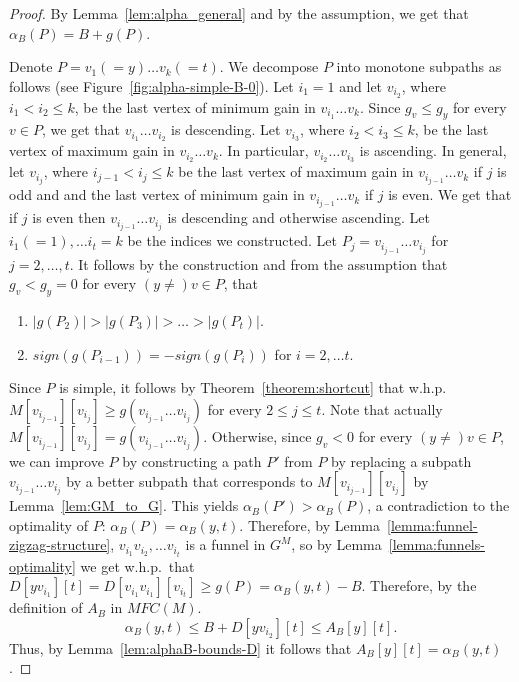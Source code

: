 \documentclass[11pt]{article}
\begin{document}
\begin{proof}
    By Lemma~\ref{lem:alpha_general} and by the assumption, we get that $\alpha_B(P) = B+g(P)$.
    
    Denote $P= v_1 (=y)\ldots v_k (=t)$. We decompose $P$ into monotone subpaths as follows (see Figure~\ref{fig:alpha-simple-B-0}).
    Let $i_1=1$ and let $v_{i_2}$, where $i_1 < i_2 \le k$, be the last vertex of minimum gain in $v_{i_1}\ldots v_k$. Since  $g_v \le g_y$ for every $ v \in P$, we get that $v_{i_1} \ldots v_{i_2}$ is descending. 
    Let $v_{i_3}$, where $i_2<i_3 \le k$, be the last vertex of maximum gain in $v_{i_2} \ldots v_{k}$. In particular, $v_{i_2} \ldots v_{i_3}$ is ascending.
    In general, let $v_{i_j}$, where $i_{j-1} < i_j\le k$ be the last vertex of maximum gain in $v_{i_{j-1}} \ldots v_{k}$ if $j$ is odd and and the last vertex of minimum gain in $v_{i_{j-1}} \ldots v_{k}$ if $j$ is even. We get that if $j$ is even then $v_{i_{j-1}} \ldots v_{i_j}$ is descending and otherwise ascending. Let $i_1(=1),\ldots i_t=k$ be the indices we constructed. Let $P_j = v_{i_{j-1}} \ldots v_{i_j}$ for $j=2,\ldots,t$. It follows by the construction and from the assumption that $g_v < g_y=0$ for every $(y\neq) v\in P$, that
    \begin{enumerate}
        \item $|g(P_2)| > |g(P_3)| > \ldots >|g(P_t)|$.
        \item $sign(g(P_{i-1})) = - sign(g(P_{i}))$ for $i=2,\ldots t$.
    \end{enumerate}

    Since $P$ is simple, it follows by Theorem~\ref{theorem:shortcut} that w.h.p.\ $M[v_{i_{j-1}}][v_{i_{j}}]\ge g(v_{i_{j-1}} \ldots v_{i_{j}})$ for every $2\le j\le t$. Note that actually $M[v_{i_{j-1}}][v_{i_{j}}] =  g(v_{i_{j-1}} \ldots v_{i_{j}})$. Otherwise, since $g_v < 0$ for every $(y\neq )v\in P$, we can improve $P$ by constructing a path $P'$ from $P$ by replacing a subpath $v_{i_{j-1}} \ldots v_{i_{j}}$ by a better subpath that corresponds to $M[v_{i_{j-1}}][v_{i_{j}}]$ by Lemma~\ref{lem:GM_to_G}. This yields $\alpha_B(P') > \alpha_B(P)$, a contradiction to the optimality of $P$: $\alpha_B(P) = \alpha_B(y,t)$. Therefore, by Lemma~\ref{lemma:funnel-zigzag-structure}, $v_{i_1} v_{i_2},\ldots v_{i_t}$ is a funnel in $G^M$, so by Lemma~\ref{lemma:funnels-optimality} we get w.h.p.\ that $D[y v_{i_1}][t] = D[v_{i_1} v_{i_1}][v_{i_t}] \ge g(P) = \alpha_B(y,t) - B$. Therefore, by the definition of $A_B$ in $MFC(M)$.
    \[\alpha_B(y,t) \le 
    B + D[y v_{i_2}][t] \le A_B[y][t].
    \]
    Thus, by Lemma~\ref{lem:alphaB-bounds-D} it follows that
     $A_B[y][t] =  \alpha_B(y,t)$.
\end{proof}
\end{document}
